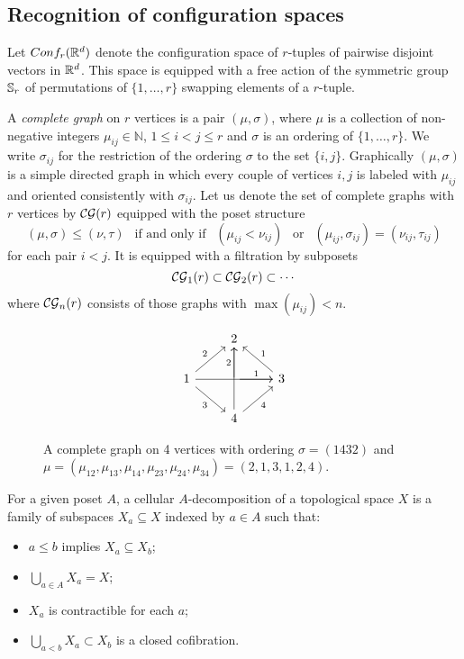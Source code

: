 \subsection{Recognition of configuration spaces}\label{ss:recognition}

Let $Conf_{r}(\mathbb{R}^{d})$ denote the configuration space of $r$-tuples of pairwise disjoint vectors in $\mathbb{R}^{d}$.
This space is equipped with a free action of the symmetric group $\mathbb{S}_r$ of permutations of $\{1,\dots,r\}$ swapping elements of a $r$-tuple.

\begin{definition}
	A \textit{complete graph} on $r$ vertices is a pair $(\mu,\sigma)$, where $\mu$ is a collection of non-negative integers $\mu_{ij}\in\mathbb{N}$, $1 \leq i < j \leq r$
	and $\sigma$ is an ordering of $\{1,\dots,r\}$.
	We write $\sigma_{ij}$ for the restriction of the ordering $\sigma$ to the set $\{i,j\}$.
	Graphically $(\mu,\sigma)$ is a simple directed graph in which every couple of vertices $i,j$ is labeled with $\mu_{ij}$ and oriented consistently with $\sigma_{ij}$.
	Let us denote the set of complete graphs with $r$ vertices by $\mathcal{CG}(r)$ equipped with the poset structure
	\begin{equation*}
		(\mu,\sigma)\le (\nu,\tau) \ \ \text{ if and only if } \ \
		(\mu_{ij}<\nu_{ij}) \ \ \text{ or } \ \
		(\mu_{ij},\sigma_{ij})= (\nu_{ij},\tau_{ij})
	\end{equation*}
	for each pair $i<j$.
	It is equipped with a filtration by subposets
	\[
	\mathcal{CG}_1(r) \subset \mathcal{CG}_2(r) \subset \dotsb
	\]
	where $\mathcal{CG}_n(r)$ consists of those graphs with $\max(\mu_{ij})< n$.
\end{definition}

\begin{figure}
	\centering
	\begin{equation*}
		\begin{tikzcd}
			\ & 2 & \  \\
			1 \arrow[ur,"2"] \arrow[rr] \arrow[dr,"3"']& \arrow[r,"1"] \arrow[u,"2"] & 3 \arrow[ul,"1"']  \\
			\ & 4 \arrow[ur,"4"'] \arrow[uu] & \
		\end{tikzcd}
	\end{equation*}
	\caption{A complete graph on 4 vertices with ordering $\sigma=(1432)$ and $\mu=(\mu_{12},\mu_{13},\mu_{14},\mu_{23},\mu_{24},\mu_{34})=(2,1,3,1,2,4)$.}
	\label{f:complete graph}
\end{figure}

\begin{definition}
	For a given poset $A$, a cellular $A$-decomposition of a topological space $X$ is a family of subspaces $X_a \subseteq X$ indexed by $a \in A$ such that:
	\begin{itemize}
		\item $a \leq b$ implies $X_a \subseteq X_b$;
		\item $\bigcup_{a \in A} X_a = X$;
		\item $X_a$ is contractible for each $a$;
		\item $\bigcup_{a<b} X_a \subset X_b$ is a closed cofibration.
	\end{itemize}
\end{definition}

